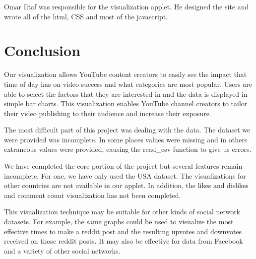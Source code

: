 \documentclass[journal]{vgtc}                %
\begin{document}
Omar Iltaf was responsible for the visualization applet. He designed the site and wrote all of the html, CSS and most of the javascript.  


\section{Conclusion}

Our visualization allows YouTube content creators to easily see the impact that time of day has on video success and what categories are most popular. Users are able to select the factors that they are interested in and the data is displayed in simple bar charts. This visualization enables YouTube channel creators to tailor their video publishing to their audience and increase their exposure. 

The most difficult part of this project was dealing with the data. The dataset we were provided was incomplete. In some places values were missing and in others extraneous values were provided, causing the read\_csv function to give us errors. 

We have completed the core portion of the project but several features remain incomplete. For one, we have only used the USA dataset. The visualizations for other countries are not available in our applet. In addition, the likes and dislikes and comment count visualization has not been completed. 

This visualization technique may be suitable for other kinds of social network datasets. For example, the same graphs could be used to visualize the most effective times to make a reddit post and the resulting upvotes and downvotes received on those reddit posts. It may also be effective for data from Facebook and a variety of other social networks.  




\end{document}
